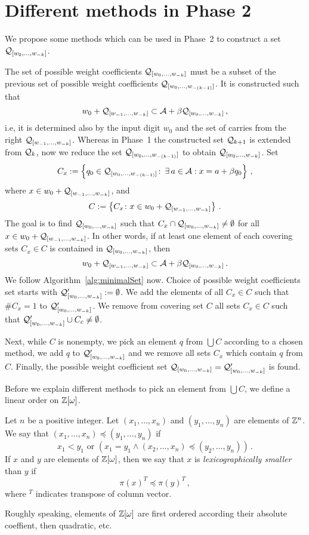 \section{Different methods in Phase 2}
\label{sec:methodsTwo}
We propose some methods which can be used in Phase~2 to construct a set $\mathcal{Q}_{[w_{0}, \dots, w_{-k}]}$.

The set of possible weight coefficients $\mathcal{Q}_{[w_{0}, \dots, w_{-k}]}$ must be a subset of the previous set of possible weight coefficients $\mathcal{Q}_{[w_{0}, \dots, w_{-(k-1)}]}$. It is constructed such that
$$
 w_0 + \mathcal{Q}_{[w_{-1}, \dots, w_{-k}]} \subset \mathcal{A} + \beta \mathcal{Q}_{[w_{0}, \dots, w_{-k}]}\,,
$$
i.e, it is determined also by the input digit $w_0$ and the set of carries from the right $\mathcal{Q}_{[w_{-1}, \dots, w_{-k}]}$. Whereas in Phase~1 the constructed set $\mathcal{Q}_{k+1}$ is extended from $\mathcal{Q}_k$, now we  reduce the set $\mathcal{Q}_{[w_{0}, \dots, w_{-(k-1)}]}$ to obtain $\mathcal{Q}_{[w_{0}, \dots, w_{-k}]}$. Set 
$$
C_x:= \left\{q_0\in\mathcal{Q}_{[w_{0}, \dots, w_{-(k-1)}]}\colon\, \exists \, a\in\mathcal{A}: x=a+\beta q_0 \right\}\,,
$$
where $x\in w_0 + \mathcal{Q}_{[w_{-1}, \dots, w_{-k}]}$, and 
$$C:=\left\{C_x\colon x\in w_0 + \mathcal{Q}_{[w_{-1}, \dots, w_{-k}]}\right\}\,.$$
 The goal is to find $\mathcal{Q}_{[w_{0}, \dots, w_{-k}]}$ such that $C_x \cap \mathcal{Q}_{[w_{0}, \dots, w_{-k}]} \neq \emptyset$ for all $x\in w_0 + \mathcal{Q}_{[w_{-1}, \dots, w_{-k}]}$. In other words, if at least one element of each covering sets $C_x\in C$ is contained in $\mathcal{Q}_{[w_{0}, \dots, w_{-k}]}$, then 
$$
 w_0 + \mathcal{Q}_{[w_{-1}, \dots, w_{-k}]} \subset \mathcal{A} + \beta \mathcal{Q}_{[w_{0}, \dots, w_{-k}]}\,.
$$
We follow Algorithm~\ref{alg:minimalSet} now. Choice of possible weight coefficients set starts with $\mathcal{Q}_{[w_{0}, \dots, w_{-k}]}':=\emptyset$. We add the elements of all $C_x\in C$ such that $\#C_x=1$ to $\mathcal{Q}_{[w_{0}, \dots, w_{-k}]}'$. We remove from covering set $C$ all sets $C_x\in C$ such that $\mathcal{Q}_{[w_{0}, \dots, w_{-k}]}' \cup C_c \neq \emptyset$. 

Next, while $C$ is nonempty, we pick an element $q$ from $\bigcup C$ according to a chosen method, we add $q$ to $\mathcal{Q}_{[w_{0}, \dots, w_{-k}]}'$ and we remove all sets $C_x$ which contain $q$ from $C$. Finally, the possible weight coefficient set $\mathcal{Q}_{[w_{0}, \dots, w_{-k}]}=\mathcal{Q}_{[w_{0}, \dots, w_{-k}]}'$ is found.

Before we explain different methods  to pick an element from $\bigcup C$, we define a linear order on $\mathbb{Z}[\omega]$.

\begin{defn}
\label{def:lexicographical}
Let $n$ be a positive integer. Let $(x_1, \dots, x_n)$ and $(y_1, \dots, y_n)$ are elements of $\mathbb{Z}^n$. We say that $(x_1, \dots, x_n)\preceq (y_1, \dots, y_n)$ if 
$$
x_1<y_1 \text{ or } \left(x_1=y_1 \wedge (x_2, \dots, x_n)\preceq (y_2, \dots, y_n)\right)\,.
$$
If $x$ and $y$ are elements of $\mathbb{Z}[\omega]$, then we say that $x$ is \emph{lexicographically smaller} than $y$ if
$$
\pi(x)^T \preceq \pi(y)^T\,,
$$
where $^T$ indicates transpose of column vector.
\end{defn}
Roughly speaking, elements of $\mathbb{Z}[\omega]$ are first ordered according their absolute coeffient, then quadratic, etc.

